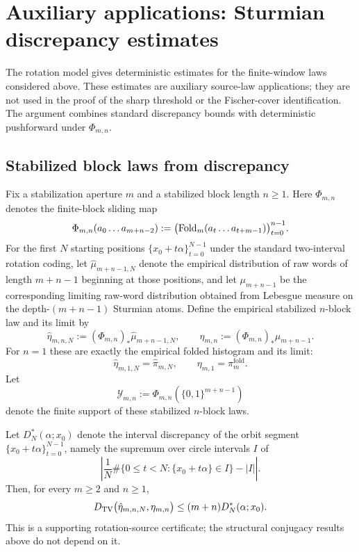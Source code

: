 \section{Auxiliary applications: Sturmian discrepancy estimates}\label{sec:fp:tv}

The rotation model gives deterministic estimates for the finite-window laws
considered above. These estimates are auxiliary source-law applications; they
are not used in the proof of the sharp threshold or the Fischer-cover
identification. The argument combines standard discrepancy bounds with
deterministic pushforward under $\Phi_{m,n}$.

\subsection{Stabilized block laws from discrepancy}

Fix a stabilization aperture $m$ and a stabilized block length $n\ge 1$. Here $\Phi_{m,n}$ denotes the finite-block sliding map
\[
\Phi_{m,n}(a_0\ldots a_{m+n-2})
:=
\bigl(\mathrm{Fold}_m(a_t\ldots a_{t+m-1})\bigr)_{t=0}^{n-1}.
\]
For the first $N$ starting positions $\{x_0+t\alpha\}_{t=0}^{N-1}$ under the standard two-interval rotation coding, let $\hat{\mu}_{m+n-1,N}$ denote the empirical distribution of raw words of length $m+n-1$ beginning at those positions, and let $\mu_{m+n-1}$ be the corresponding limiting raw-word distribution obtained from Lebesgue measure on the depth-$(m+n-1)$ Sturmian atoms. Define the empirical stabilized $n$-block law and its limit by
\[
\hat{\eta}_{m,n,N}:=(\Phi_{m,n})_*\hat{\mu}_{m+n-1,N},
\qquad
\eta_{m,n}:=(\Phi_{m,n})_*\mu_{m+n-1}.
\]
For $n=1$ these are exactly the empirical folded histogram and its limit:
\[
\hat{\eta}_{m,1,N}=\hat{\pi}_{m,N},
\qquad
\eta_{m,1}=\pi_m^{\mathrm{fold}}.
\]
Let
\[
\mathcal Y_{m,n}:=\Phi_{m,n}(\{0,1\}^{m+n-1})
\]
denote the finite support of these stabilized $n$-block laws.

\begin{theorem}\label{thm:tv-certificate}
Let $D_N^*(\alpha;x_0)$ denote the interval discrepancy of the orbit segment
$\{x_0+t\alpha\}_{t=0}^{N-1}$, namely the supremum over circle intervals $I$
of
\[
\left|
\frac1N\#\{0\le t<N:\{x_0+t\alpha\}\in I\}-|I|
\right|.
\]
Then, for every $m\ge2$ and $n\ge1$,
\[
D_{\mathrm{TV}}\bigl(\hat{\eta}_{m,n,N},\eta_{m,n}\bigr)
\le (m+n)D_N^*(\alpha;x_0).
\]
This is a supporting rotation-source certificate; the structural conjugacy
results above do not depend on it.
\end{theorem}

